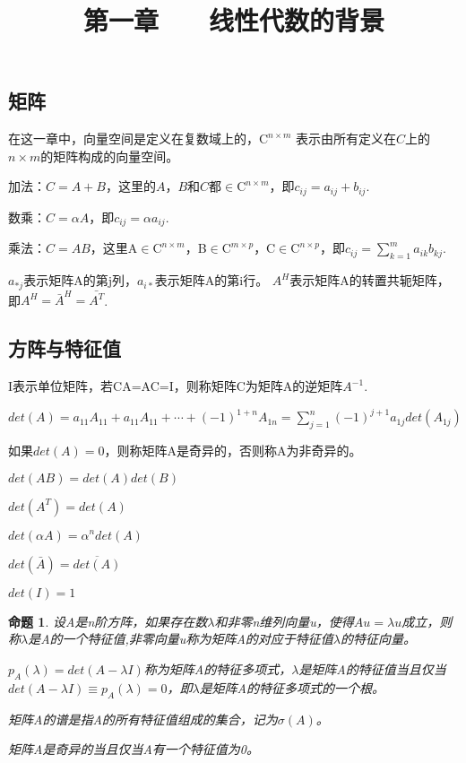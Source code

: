 \documentclass{article}
\begin{document}
\title{第一章$\qquad$线性代数的背景}
\maketitle  %
\section{}
\subsection{矩阵}
在这一章中，向量空间是定义在复数域上的，$\mathrm{C}^{n\times m}$ 表示由所有定义在$C$上的$n\times m$的矩阵构成的向量空间。

加法：$C=A+B$，这里的$A$，$B$和$C$都$\in\mathrm{C}^{n\times m}$，即$c_{ij}=a_{ij}+b_{ij}$.

数乘：$C=\alpha A$，即$c_{ij}=\alpha a_{ij}$.

乘法：$C=AB$，这里A$\in\mathrm{C}^{n\times m}$，B$\in\mathrm{C}^{m\times p}$，C$\in\mathrm{C}^{n\times p}$，即$c_{ij}=\sum_{k=1}^m a_{ik}b_{kj}$.

$a_{*j}$表示矩阵A的第j列，$a_{i*}$表示矩阵A的第i行。
$A^H$表示矩阵A的转置共轭矩阵，即$A^H=\bar{A}^H=\bar{A^T}$.
\subsection{方阵与特征值}
I表示单位矩阵，若CA=AC=I，则称矩阵C为矩阵A的逆矩阵$A^{-1}$.

$det(A)=a_{11}A_{11}+a_{11}A_{11}+\cdots+(-1)^{1+n}A_{1n}=\sum_{j=1}^n (-1)^{j+1} a_{1j}det(A_{1j}) $  

如果$det(A)=0$，则称矩阵A是奇异的，否则称A为非奇异的。

$det(AB)=det(A)det(B)$

$det(A^T)=det(A)$

$det(\alpha A)=\alpha ^n det(A)$

$det(\bar{A})=\overline{det(A)}$

$det(I)=1$

\newtheorem{thm}{命题}
\begin{thm}
设A是n阶方阵，如果存在数$\lambda$和非零n维列向量u，使得$Au=\lambda u$成立，则称$\lambda$是A的一个特征值,非零向量u称为矩阵A的对应于特征值$\lambda$的特征向量。

$p_A(\lambda)=det(A-\lambda I)$称为矩阵A的特征多项式，$\lambda $是矩阵A的特征值当且仅当$det(A-\lambda I)\equiv p_A(\lambda)=0$，即$\lambda $是矩阵A的特征多项式的一个根。

矩阵A的谱是指A的所有特征值组成的集合，记为$\sigma (A)$。

矩阵A是奇异的当且仅当A有一个特征值为0。
\end{thm}
\end{document}
